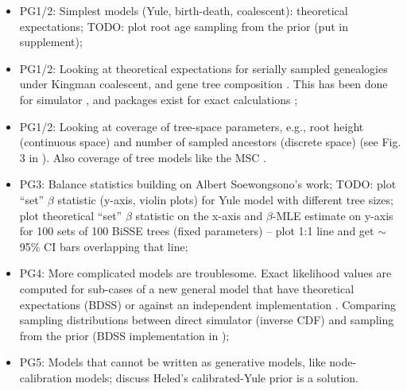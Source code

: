 \documentclass[oneside]{article}
\begin{document}

\begin{itemize}
\item PG1/2: Simplest models (Yule, birth-death, coalescent): theoretical expectations; TODO: plot root age sampling from the prior (put in supplement);
\item PG1/2: Looking at theoretical expectations for serially sampled genealogies under Kingman coalescent, and gene tree composition \citep{rosenberg02}.
This has been done for simulator \citep{mendes18}, and packages exist for exact calculations \citep{kim19};
\item PG1/2: Looking at coverage of tree-space parameters, e.g., root height (continuous space) and number of sampled ancestors (discrete space) (see Fig. 3 in \citealp{gavryushkina14}).
Also coverage of tree models like the MSC \citep{ogilvie22}.
\item PG3: Balance statistics building on Albert Soewongsono's work; TODO: plot ``set'' $\beta$ statistic (y-axis, violin plots) for Yule model with different tree sizes; plot theoretical ``set'' $\beta$ statistic on the x-axis and $\beta$-MLE estimate on y-axis for 100 sets of 100 BiSSE trees (fixed parameters) -- plot 1:1 line and get $\sim$ 95\% CI bars overlapping that line;
\item PG4: More complicated models are troublesome.
  Exact likelihood values are computed for sub-cases of a new general model that have theoretical expectations (BDSS) or against an independent implementation \citep{andreoletti22}.
  Comparing sampling distributions between direct simulator (inverse CDF) and sampling from the prior (BDSS implementation in \citealp{zhang23});
\item PG5: Models that cannot be written as generative models, like node-calibration models; discuss Heled's calibrated-Yule prior is a solution.
\end{itemize}
\end{document}
